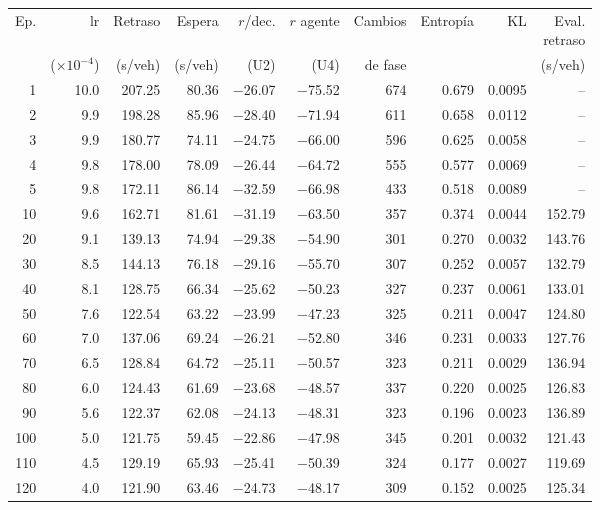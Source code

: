 \begin{table}[H]
\centering
\scriptsize
\setlength{\tabcolsep}{3pt}
\setlength{\tabcolsep}{2pt}
\begin{tabular}{rrrrrrrrrr}
\toprule
Ep. & lr & Retraso & Espera & $r$/dec. & $r$ agente & Cambios & Entropía & KL & \makecell{Eval.\\retraso} \\
 & ($\times 10^{-4}$) & (s/veh) & (s/veh) & (U2) & (U4) & de fase &  &  & (s/veh) \\
\midrule
1 & 10.0 & 207.25 & 80.36 & $-$26.07 & $-$75.52 & 674 & 0.679 & 0.0095 & -- \\
2 & 9.9 & 198.28 & 85.96 & $-$28.40 & $-$71.94 & 611 & 0.658 & 0.0112 & -- \\
3 & 9.9 & 180.77 & 74.11 & $-$24.75 & $-$66.00 & 596 & 0.625 & 0.0058 & -- \\
4 & 9.8 & 178.00 & 78.09 & $-$26.44 & $-$64.72 & 555 & 0.577 & 0.0069 & -- \\
5 & 9.8 & 172.11 & 86.14 & $-$32.59 & $-$66.98 & 433 & 0.518 & 0.0089 & -- \\
10 & 9.6 & 162.71 & 81.61 & $-$31.19 & $-$63.50 & 357 & 0.374 & 0.0044 & 152.79 \\
20 & 9.1 & 139.13 & 74.94 & $-$29.38 & $-$54.90 & 301 & 0.270 & 0.0032 & 143.76 \\
30 & 8.5 & 144.13 & 76.18 & $-$29.16 & $-$55.70 & 307 & 0.252 & 0.0057 & 132.79 \\
40 & 8.1 & 128.75 & 66.34 & $-$25.62 & $-$50.23 & 327 & 0.237 & 0.0061 & 133.01 \\
50 & 7.6 & 122.54 & 63.22 & $-$23.99 & $-$47.23 & 325 & 0.211 & 0.0047 & 124.80 \\
60 & 7.0 & 137.06 & 69.24 & $-$26.21 & $-$52.80 & 346 & 0.231 & 0.0033 & 127.76 \\
70 & 6.5 & 128.84 & 64.72 & $-$25.11 & $-$50.57 & 323 & 0.211 & 0.0029 & 136.94 \\
80 & 6.0 & 124.43 & 61.69 & $-$23.68 & $-$48.57 & 337 & 0.220 & 0.0025 & 126.83 \\
90 & 5.6 & 122.37 & 62.08 & $-$24.13 & $-$48.31 & 323 & 0.196 & 0.0023 & 136.89 \\
100 & 5.0 & 121.75 & 59.45 & $-$22.86 & $-$47.98 & 345 & 0.201 & 0.0032 & 121.43 \\
110 & 4.5 & 129.19 & 65.93 & $-$25.41 & $-$50.39 & 324 & 0.177 & 0.0027 & 119.69 \\
120 & 4.0 & 121.90 & 63.46 & $-$24.73 & $-$48.17 & 309 & 0.152 & 0.0025 & 125.34 \\

\end{tabular}
\end{table}
